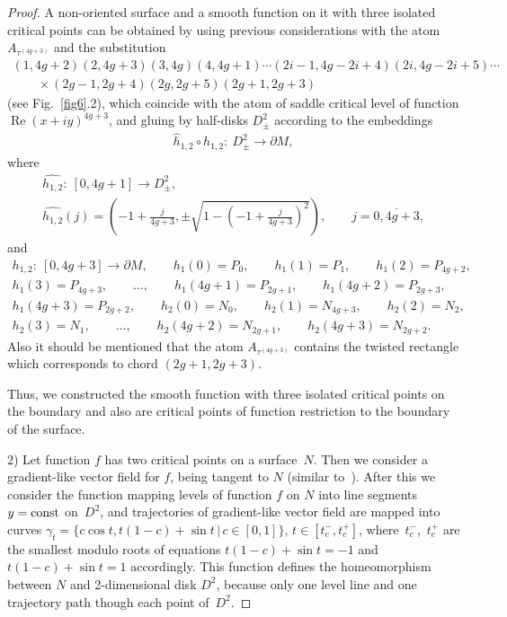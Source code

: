 \documentclass[pdftex]{sigma}
\numberwithin{equation}{section}
\begin{document}
\begin{proof}
A non-oriented surface and a smooth function on it with three isolated critical points can be obtained by using previous considerations with the atom $A_{\tau^{(4g+3)}}$ and the substitution
\begin{gather*}
(1,4g+2)(2,4g+3)(3,4g)(4,4g+1)\cdots(2i-1,4g-2i+4)(2i,4g-2i+5)\cdots\\
\qquad{}\times (2g-1,2g+4)(2g,2g+5)(2g+1,2g+3)
\end{gather*}
(see Fig.~\ref{fig6}.2), which coincide with the atom of saddle critical level of function $\operatorname{Re}(x+iy)^{4g+3}$, and gluing by half-disks $D^{2}_{\pm}$ according to the embeddings
\begin{gather*}
\widehat{h}_{1,2} \circ h_{1,2}\colon \ D^{2}_{\pm} \rightarrow \partial M,
 \end{gather*}
 where
 \begin{gather*}
 \widehat{h_{1,2}}\colon \ [0,4g+1]\rightarrow D^{2}_{\pm}, \\
 \widehat{h_{1,2}}(j)=\left(-1+\frac{j}{4g+3},\pm\sqrt{1-(-1+\frac{j}{4g+3})^{2}}\right), \qquad j=\overline{0,4g+3},
 \end{gather*}
 and
 \begin{gather*}
 h_{1,2}\colon \ [0,4g+3] \rightarrow \partial M,
\qquad h_{1}(0)=P_{0}, \qquad h_{1}(1)=P_{1}, \qquad h_{1}(2)=P_{4g+2}, \\
h_{1}(3)=P_{4g+3}, \qquad \ldots, \qquad h_{1}(4g+1)=P_{2g+1}, \qquad h_{1}(4g+2)=P_{2g+3},\\
 h_{1}(4g+3)=P_{2g+2}, \qquad h_{2}(0)=N_{0}, \qquad h_{2}(1)=N_{4g+3}, \qquad h_{2}(2)=N_{2},\\
 h_{2}(3)=N_{1}, \qquad \ldots, \qquad h_{2}(4g+2)=N_{2g+1}, \qquad h_{2}(4g+3)=N_{2g+2}.
\end{gather*}
Also it should be mentioned that the atom $A_{\tau^{(4g+3)}}$ contains the twisted rectangle which corresponds to chord $(2g+1,2g+3)$.

Thus, we constructed the smooth function with three isolated critical points on the boundary and also are critical points of function restriction to the boundary of the surface.

2) Let function $f$ has two critical points on a surface~$N$. Then we consider a gradient-like vector f\/ield for $f$, being tangent to $N$ (similar to~\cite{Borodzic/Nemeti/Ranicki}). After this we consider the function mapping levels of function $f$ on $N$ into line segments $y={\rm const}$ on~$D^{2}$, and trajectories of gradient-like vector f\/ield are mapped into curves $\gamma_{t}=\{c\cos{t},t(1-c)+\sin{t} \,|\, c\in[0,1]\}$, $t\in[t_{c}^{-},t_{c}^{+}]$, where~$t_{c}^{-}$,~$t_{c}^{+}$ are the smallest modulo roots of equations $t(1-c)+\sin{t}=-1$ and $t(1-c)+\sin{t}=1$ accordingly. This function def\/ines the homeomorphism between $N$ and 2-dimensional disk $D^{2}$, because only one level line and one trajectory path though each point of~$D^{2}$.


\end{proof}
\end{document}

